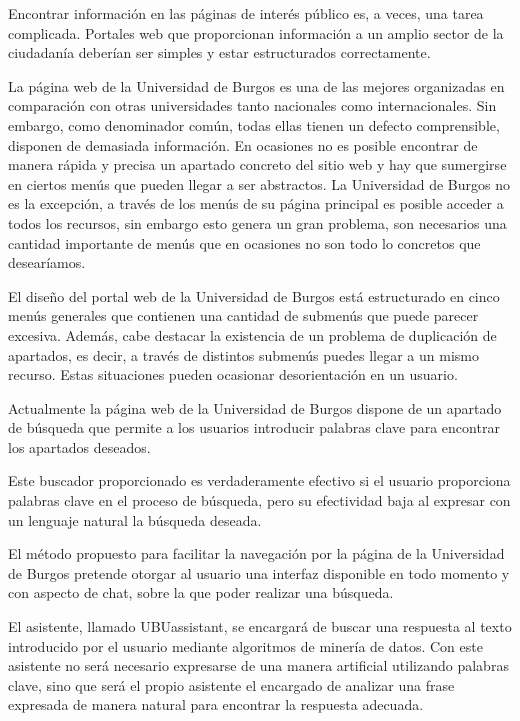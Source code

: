 
Encontrar información en las páginas de interés público es, a veces, una tarea complicada. Portales web que proporcionan información a un amplio sector de la ciudadanía deberían ser simples y estar estructurados correctamente.

La página web de la Universidad de Burgos es una de las mejores organizadas en comparación con otras universidades tanto nacionales como internacionales. Sin embargo, como denominador común, todas ellas tienen un defecto comprensible, disponen de demasiada información. En ocasiones no es posible encontrar de manera rápida y precisa un apartado concreto del sitio web y hay que sumergirse en ciertos menús que pueden llegar a ser abstractos. La Universidad de Burgos no es la excepción, a través de los menús de su página principal es posible acceder a todos los recursos, sin embargo esto genera un gran problema, son necesarios una cantidad importante de menús que en ocasiones no son todo lo concretos que desearíamos.

El diseño del portal web de la Universidad de Burgos está estructurado en cinco menús generales que contienen una cantidad de submenús que puede parecer excesiva. Además, cabe destacar la existencia de un problema de duplicación de apartados, es decir, a través de distintos submenús puedes llegar a un mismo recurso. Estas situaciones pueden ocasionar desorientación en un usuario.

Actualmente la página web de la Universidad de Burgos dispone de un apartado de búsqueda que permite a los usuarios introducir palabras clave para encontrar los apartados deseados.

Este buscador proporcionado es verdaderamente efectivo si el usuario proporciona palabras clave en el proceso de búsqueda, pero su efectividad baja al expresar con un lenguaje natural la búsqueda deseada.

El método propuesto para facilitar la navegación por la página de la Universidad de Burgos pretende otorgar al usuario una interfaz disponible en todo momento y con aspecto de chat, sobre la que poder realizar una búsqueda. 

El asistente, llamado UBUassistant, se encargará de buscar una respuesta al texto introducido por el usuario mediante algoritmos de minería de datos. Con este asistente no será necesario expresarse de una manera artificial utilizando palabras clave, sino que será el propio asistente el encargado de analizar una frase expresada de manera natural para encontrar la respuesta adecuada.

